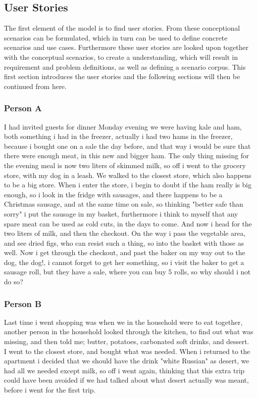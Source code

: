 \subsection{User Stories} \label{UserStories}
The first element of the model is to find user stories. From these conceptional scenarios can be formulated, which in turn can be used to define concrete scenarios and use cases. Furthermore these user stories are looked upon together with the conceptual scenarios, to create a understanding, which will result in requirement and problem definitions, as well as defining a scenario corpus. This first section introduces the user stories and the following sections will then be continued from here. 

\subsubsection{Person A}
I had invited guests for dinner Monday evening we were having kale and ham, both something i had in the freezer, actually i had two hams in the freezer, because i bought one on a sale the day before, and that way i would be sure that there were enough meat, in this new and bigger ham. The only thing missing for the evening meal is now two liters of skimmed milk, so off i went to the grocery store, with my dog in a leash. We walked to the closest store, which also happens to be a big store. When i enter the store, i begin to doubt if the ham really is big enough, so i look in the fridge with sausages, and there happens to be a Christmas sausage, and at the same time on sale, so thinking "better safe than sorry" i put the sausage in my basket, furthermore i think to myself that any spare meat can be used as cold cuts, in the days to come. And now i head for the two liters of milk, and then the checkout. On the way i pass the vegetable area, and see dried figs, who can resist such a thing, so into the basket with those as well. Now i get through the checkout, and past the baker on my way out to the dog, the dog!, i cannot forget to get her something, so i visit the baker to get a sausage roll, but they have a sale, where you can buy 5 rolls, so why should i not do so?

\subsubsection{Person B}
Last time i went shopping was when we in the household were to eat together, another person in the household looked through the kitchen, to find out what was missing, and then told me; butter, potatoes, carbonated soft drinks, and dessert. I went to the closest store, and bought what was needed. When i returned to the apartment i decided that we should have the drink "white Russian" as desert, we had all we needed except milk, so off i went again, thinking that this extra trip could have been avoided if we had talked about what desert actually was meant, before i went for the first trip.
 
